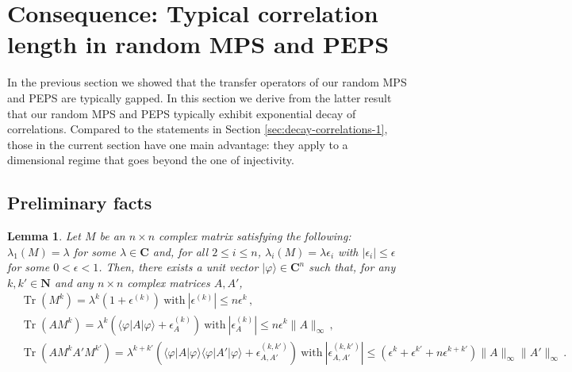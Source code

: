 \documentclass{amsart}
\newtheorem{lemma}[theorem]{Lemma}
\newcommand{\N}{\mathbf{N}}
\newcommand{\C}{\mathbf{C}}
\renewcommand{\leq}{\leqslant}
\DeclareMathOperator{\Tr}{Tr}
\newcommand{\bra}[1]{\langle #1 |}
\newcommand{\ket}[1]{| #1 \rangle}
\begin{document}
\section{Consequence: Typical correlation length in random MPS and PEPS}
\label{sec:decay-correlations-2}

In the previous section we showed that the transfer operators of our random MPS and PEPS are typically gapped. In this section we derive from the latter result that our random MPS and PEPS typically exhibit exponential decay of correlations. Compared to the statements in Section \ref{sec:decay-correlations-1}, those in the current section have one main advantage: they apply to a dimensional regime that goes beyond the one of injectivity.

\subsection{Preliminary facts} \hfill\par\smallskip

\begin{lemma} \label{lem:trace-powers}
    Let $M$ be an $n\times n$ complex matrix satisfying the following: $\lambda_1(M)=\lambda$ for some $\lambda\in\C$ and, for all $2\leq i\leq n$, $\lambda_i(M)=\lambda\epsilon_i$ with $|\epsilon_i|\leq \epsilon$ for some $0<\epsilon<1$. Then, there exists a unit vector $\ket{\varphi}\in\C^n$ such that, for any $k,k'\in\N$ and any $n\times n$ complex matrices $A,A'$,
    \begin{align*}
         & \Tr(M^k) = \lambda^k\left(1+\epsilon^{(k)}\right)\ \text{with}\ |\epsilon^{(k)}|\leq n\epsilon^k \, ,                                                                                                                                                      \\
         & \Tr(AM^k) = \lambda^k\left(\bra{\varphi}A\ket{\varphi}+\epsilon^{(k)}_A\right)\ \text{with}\ |\epsilon^{(k)}_A|\leq n\epsilon^k\|A\|_{\infty} \, ,                                                                                                         \\
         & \Tr(AM^kA'M^{k'}) = \lambda^{k+k'}\left(\bra{\varphi}A\ket{\varphi}\bra{\varphi}A'\ket{\varphi}+\epsilon^{(k,k')}_{A,A'}\right)\ \text{with}\ |\epsilon^{(k,k')}_{A,A'}|\leq (\epsilon^k+\epsilon^{k'}+n\epsilon^{k+k'})\|A\|_{\infty}\|A'\|_{\infty} \, . \\
    \end{align*}
\end{lemma}
\end{document}
